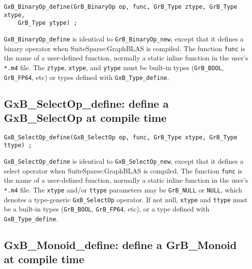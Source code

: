 \documentclass[12pt]{article}
\begin{document}
\begin{mdframed}[userdefinedwidth=6in]
{\footnotesize
\begin{verbatim}
GxB_BinaryOp_define(GrB_BinaryOp op, func, GrB_Type ztype, GrB_Type xtype,
    GrB_Type ytype) ;
\end{verbatim} } \end{mdframed}

    \verb'GxB_BinaryOp_define' is identical to \verb'GrB_BinaryOp_new', except
    that it defines a binary operator when SuiteSparse:GraphBLAS is compiled.
    The function \verb'func' is the name of a user-defined function, normally a
    static inline function in the user's \verb'*.m4' file.  The \verb'ztype',
    \verb'xtype', and \verb'ytype' must be built-in types (\verb'GrB_BOOL',
    \verb'GrB_FP64', etc) or types defined with \verb'GxB_Type_define'.

\newpage
\subsection{{\sf GxB\_SelectOp\_define:}
define a {\sf GxB\_SelectOp} at compile time}
\label{selectop_define}

\begin{mdframed}[userdefinedwidth=6in]
{\footnotesize
\begin{verbatim}
GxB_SelectOp_define(GxB_SelectOp op, func, GrB_Type xtype, GrB_Type ttype) ;
\end{verbatim} } \end{mdframed}

    \verb'GxB_SelectOp_define' is identical to \verb'GxB_SelectOp_new', except
    that it defines a select operator when SuiteSparse:GraphBLAS is compiled.
    The function \verb'func' is the name of a user-defined function, normally a
    static inline function in the user's \verb'*.m4' file.  The \verb'xtype'
    and/or \verb'ttype' parameters
    may be \verb'GrB_NULL' or \verb'NULL', which denotes a type-generic
    \verb'GxB_SelectOp' operator.  If not null, \verb'xtype' and
    \verb'ttype' must be a built-in
    types (\verb'GrB_BOOL', \verb'GrB_FP64', etc), or a type defined with
    \verb'GxB_Type_define'.

\subsection{{\sf GxB\_Monoid\_define:}
define a {\sf GrB\_Monoid} at compile time}
\label{monoid_define}
\end{document}
